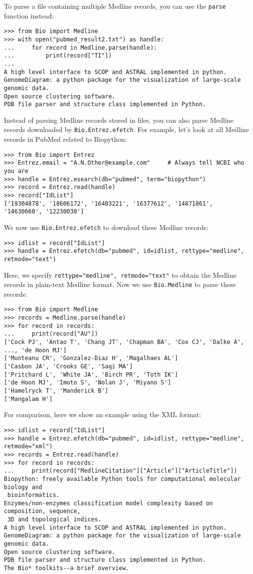 \documentclass{report}
\begin{document}
To parse a file containing multiple Medline records, you can use the \verb+parse+ function instead:
\begin{verbatim}
>>> from Bio import Medline
>>> with open("pubmed_result2.txt") as handle:
...     for record in Medline.parse(handle):
...         print(record["TI"])
...
A high level interface to SCOP and ASTRAL implemented in python.
GenomeDiagram: a python package for the visualization of large-scale genomic data.
Open source clustering software.
PDB file parser and structure class implemented in Python.
\end{verbatim}

Instead of parsing Medline records stored in files, you can also parse Medline records downloaded by \verb+Bio.Entrez.efetch+. For example, let's look at all Medline records in PubMed related to Biopython:
\begin{verbatim}
>>> from Bio import Entrez
>>> Entrez.email = "A.N.Other@example.com"     # Always tell NCBI who you are
>>> handle = Entrez.esearch(db="pubmed", term="biopython")
>>> record = Entrez.read(handle)
>>> record["IdList"]
['19304878', '18606172', '16403221', '16377612', '14871861', '14630660', '12230038']
\end{verbatim}
We now use \verb+Bio.Entrez.efetch+ to download these Medline records:
\begin{verbatim}
>>> idlist = record["IdList"]
>>> handle = Entrez.efetch(db="pubmed", id=idlist, rettype="medline", retmode="text")
\end{verbatim}
Here, we specify \verb+rettype="medline", retmode="text"+ to obtain the Medline records in plain-text Medline format. Now we use \verb+Bio.Medline+ to parse these records:
\begin{verbatim}
>>> from Bio import Medline
>>> records = Medline.parse(handle)
>>> for record in records:
...     print(record["AU"])
['Cock PJ', 'Antao T', 'Chang JT', 'Chapman BA', 'Cox CJ', 'Dalke A', ..., 'de Hoon MJ']
['Munteanu CR', 'Gonzalez-Diaz H', 'Magalhaes AL']
['Casbon JA', 'Crooks GE', 'Saqi MA']
['Pritchard L', 'White JA', 'Birch PR', 'Toth IK']
['de Hoon MJ', 'Imoto S', 'Nolan J', 'Miyano S']
['Hamelryck T', 'Manderick B']
['Mangalam H']
\end{verbatim}

For comparison, here we show an example using the XML format:
\begin{verbatim}
>>> idlist = record["IdList"]
>>> handle = Entrez.efetch(db="pubmed", id=idlist, rettype="medline", retmode="xml")
>>> records = Entrez.read(handle)
>>> for record in records:
...     print(record["MedlineCitation"]["Article"]["ArticleTitle"])
Biopython: freely available Python tools for computational molecular biology and
 bioinformatics.
Enzymes/non-enzymes classification model complexity based on composition, sequence,
 3D and topological indices.
A high level interface to SCOP and ASTRAL implemented in python.
GenomeDiagram: a python package for the visualization of large-scale genomic data.
Open source clustering software.
PDB file parser and structure class implemented in Python.
The Bio* toolkits--a brief overview.
\end{verbatim}
\end{document}
